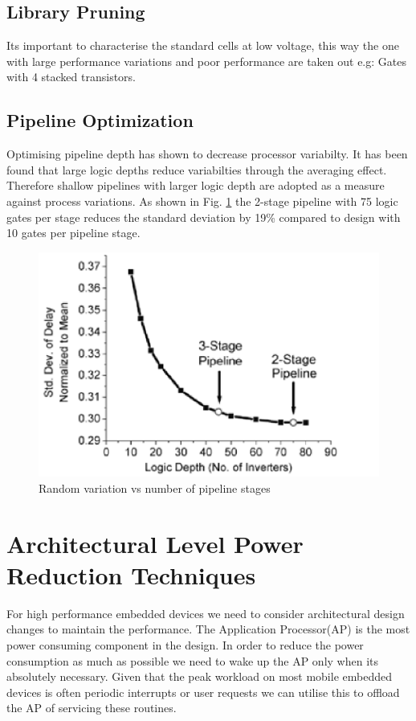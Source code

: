 \documentclass[conference]{IEEEtran}
\begin{document}
\subsection{Library Pruning}
Its important to characterise the standard cells at low voltage, this way the one with large performance variations and poor performance are taken out e.g: Gates with 4 stacked transistors.
\subsection{Pipeline Optimization}
Optimising pipeline depth has shown to decrease processor variabilty. It has been found that large logic depths reduce variabilties through the averaging effect. Therefore shallow pipelines with larger logic depth are adopted as a measure against process variations. As shown in Fig. \ref{fig:PplstageVSlogicdepth} the 2-stage pipeline with 75 logic gates per stage reduces the standard deviation by 19\% compared to design with 10 gates per pipeline stage.

\begin{figure}[htbp]
	\includegraphics[width=\linewidth]{img/Pictures/PplstageVSlogicdepth.png}
	\centering
	\caption{Random variation vs number of pipeline stages \cite{b1}}
	\label{fig:PplstageVSlogicdepth}
\end{figure}

\section{Architectural Level Power Reduction Techniques} \label{sec:Case_Study}
For high performance embedded devices we need to consider architectural design
changes to maintain the performance. The Application Processor(AP) is the most
power consuming component in the design. In order to reduce the power consumption as
much as possible we need to wake up the AP only when its absolutely necessary.
Given that the peak workload on most mobile embedded devices is often
periodic interrupts or user requests we can utilise this to offload the
AP of servicing these routines.
\end{document}

